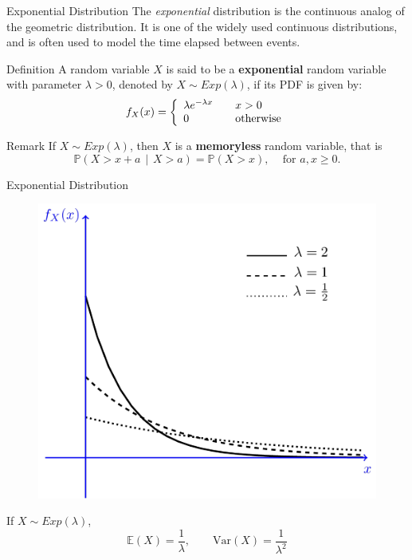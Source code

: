\documentclass{beamer}
\newcommand{\E}{\mathbb{E}}
\newcommand{\PP}{\mathbb{P}}
\newcommand{\Var}{\text{Var}}
\begin{document}
	
	
	\begin{frame}{Exponential Distribution}
		The \textit{exponential} distribution is the continuous analog of the geometric distribution. It is one of the widely used continuous distributions, and is often used to model the time elapsed between events.
		
		\pause
		
		\begin{block}{Definition}
			A random variable $X$ is said to be a \textbf{exponential} random variable with parameter $\lambda>0$, denoted by $X\sim Exp(\lambda)$, if its PDF is given by:
		\begin{equation}
			\nonumber f_X(x) = \left\{
			\begin{array}{l l}
				\lambda e^{-\lambda x} & \quad x > 0\\
				0 & \quad \text{otherwise}
			\end{array} \right.
		\end{equation}
		\end{block}\pause
		
		\begin{block}{Remark}
		If $X\sim Exp(\lambda)$, then $X$ is a \textbf{memoryless} random variable, that is
		\[\PP(X > x+a \hspace{5pt} | \hspace{5pt} X > a)=\PP(X > x), \hspace{10pt} \text{ for }a,x \geq 0.\]
		\end{block}
		
	\end{frame}
	\begin{frame}{Exponential Distribution}
\begin{figure}
	\centering
	\label{fig:0}
	\includegraphics[width=0.6\linewidth]{0.40}
\end{figure}
		\pause
		If $X\sim Exp(\lambda)$,
		\[ \E(X) = \frac{1}{\lambda},\qquad \Var(X)=\frac{1}{\lambda^2} \]
	
	\end{frame}
	
\end{document}

